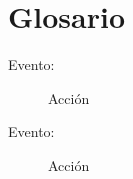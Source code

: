 \section{Glosario}

\begin{description}

\item[Evento:] Acción  
\item[Evento:] Acción  



\end{description}
